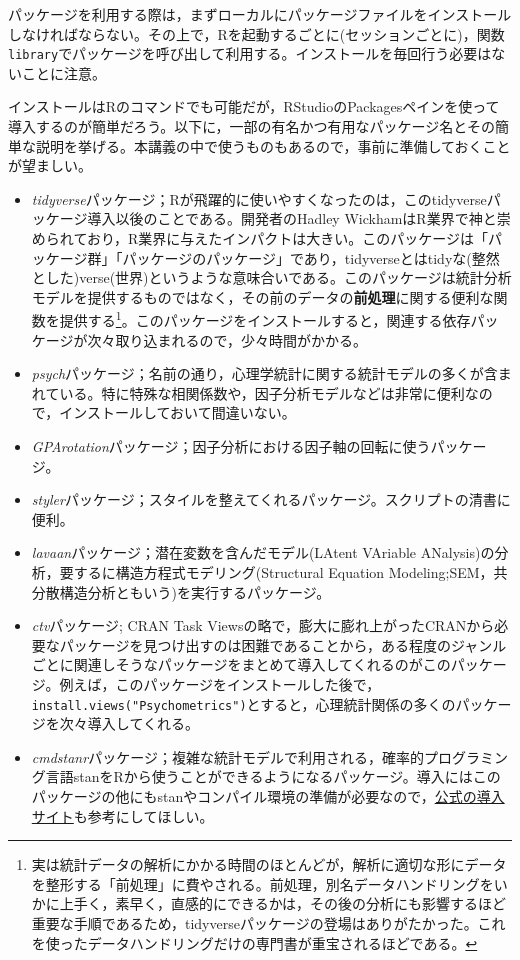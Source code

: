 \documentclass[
  a4paper,
]{ltjsbook}
\providecommand{\tightlist}{%
  \setlength{\itemsep}{0pt}\setlength{\parskip}{0pt}}\usepackage{longtable,booktabs,array}
\begin{document}
パッケージを利用する際は，まずローカルにパッケージファイルをインストールしなければならない。その上で，Rを起動するごとに(セッションごとに)，関数\texttt{library}でパッケージを呼び出して利用する。インストールを毎回行う必要はないことに注意。

インストールはRのコマンドでも可能だが，RStudioのPackagesペインを使って導入するのが簡単だろう。以下に，一部の有名かつ有用なパッケージ名とその簡単な説明を挙げる。本講義の中で使うものもあるので，事前に準備しておくことが望ましい。

\begin{itemize}
\tightlist
\item
  \emph{tidyverse}パッケージ\autocite{tidyverse}；Rが飛躍的に使いやすくなったのは，このtidyverseパッケージ導入以後のことである。開発者のHadley
  WickhamはR業界で神と崇められており，R業界に与えたインパクトは大きい。このパッケージは「パッケージ群」「パッケージのパッケージ」であり，tidyverseとはtidyな(整然とした)verse(世界)というような意味合いである。このパッケージは統計分析モデルを提供するものではなく，その前のデータの\textbf{前処理}に関する便利な関数を提供する\footnote{実は統計データの解析にかかる時間のほとんどが，解析に適切な形にデータを整形する「前処理」に費やされる。前処理，別名データハンドリングをいかに上手く，素早く，直感的にできるかは，その後の分析にも影響するほど重要な手順であるため，tidyverseパッケージの登場はありがたかった。これを使ったデータハンドリングだけの専門書\autocite{Kinosady2021}が重宝されるほどである。}。このパッケージをインストールすると，関連する依存パッケージが次々取り込まれるので，少々時間がかかる。
\item
  \emph{psych}パッケージ\autocite{psych}；名前の通り，心理学統計に関する統計モデルの多くが含まれている。特に特殊な相関係数や，因子分析モデルなどは非常に便利なので，インストールしておいて間違いない。
\item
  \emph{GPArotation}パッケージ\autocite{GPArotation}；因子分析における因子軸の回転に使うパッケージ。
\item
  \emph{styler}パッケージ；スタイルを整えてくれるパッケージ。スクリプトの清書に便利。
\item
  \emph{lavaan}パッケージ\autocite{lavaan}；潜在変数を含んだモデル(LAtent
  VAriable ANalysis)の分析，要するに構造方程式モデリング(Structural
  Equation Modeling;SEM，共分散構造分析ともいう)を実行するパッケージ。
\item
  \emph{ctv}パッケージ\autocite{CTV}; CRAN Task
  Viewsの略で，膨大に膨れ上がったCRANから必要なパッケージを見つけ出すのは困難であることから，ある程度のジャンルごとに関連しそうなパッケージをまとめて導入してくれるのがこのパッケージ。例えば，このパッケージをインストールした後で，\texttt{install.views("Psychometrics")}とすると，心理統計関係の多くのパッケージを次々導入してくれる。
\item
  \emph{cmdstanr}パッケージ\autocite{cmdstanr}；複雑な統計モデルで利用される，確率的プログラミング言語stanをRから使うことができるようになるパッケージ。導入にはこのパッケージの他にもstanやコンパイル環境の準備が必要なので，\href{https://mc-stan.org/cmdstanr/articles/cmdstanr.html}{公式の導入サイト}も参考にしてほしい。
\end{itemize}
\end{document}
